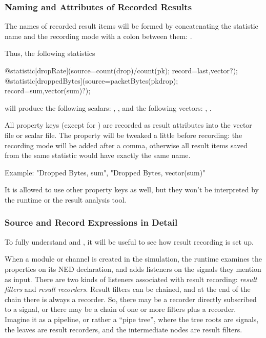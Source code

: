 \begin{ned}
\subsubsection{Naming and Attributes of Recorded Results}
\label{sec:simple-modules:naming-and-attributes-of-recorded-results}

The names of recorded result items will be formed by concatenating the
statistic name and the recording mode with a colon between them:
.

Thus, the following statistics

\begin{ned}
@statistic[dropRate](source=count(drop)/count(pk); record=last,vector?);
@statistic[droppedBytes](source=packetBytes(pkdrop); record=sum,vector(sum)?);
\end{ned}

will produce the following scalars: , ,
and the following vectors: , .

All property keys (except for ) are recorded as result
attributes into the vector file or scalar file. The  property
will be tweaked a little before recording: the recording mode will be added
after a comma, otherwise all result items saved from the same statistic
would have exactly the same name.

Example: "Dropped Bytes, sum", "Dropped Bytes, vector(sum)"


It is allowed to use other property keys as well, but they won't be
interpreted by the {\opp} runtime or the result analysis tool.


\subsubsection{Source and Record Expressions in Detail}
\label{sec:simple-modules:statistic-source-and-record-details}

To fully understand  and , it will be useful to see
how result recording is set up.

When a module or channel is created in the simulation, the {\opp} runtime
examines the  properties on its NED declaration, and adds
listeners on the signals they mention as input. There are two kinds of
listeners associated with result recording: \textit{result filters} and
\textit{result recorders}. Result filters can be chained, and at the end of
the chain there is always a recorder. So, there may be a recorder directly
subscribed to a signal, or there may be a chain of one or more filters plus
a recorder. Imagine it as a pipeline, or rather a ``pipe tree'', where the
tree roots are signals, the leaves are result recorders, and the
intermediate nodes are result filters.


\end{ned}
